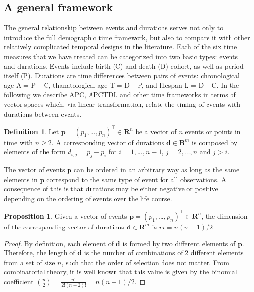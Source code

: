 \documentclass{bmcart}
\theoremstyle{definition}
\newtheorem{definition}{Definition}[section]
\newtheorem{proposition}{Proposition}[section]
\begin{document}
\subsection{A general framework}
\label{sec:framework}

The general relationship between events and durations serves not only to
introduce the full demographic time framework, but also to compare it with
other relatively complicated temporal designs in the literature. Each of the six
time measures that we have treated can be categorized into two basic types:
events and durations. Events include birth (C) and death (D) cohort, as well as period
itself (P). Durations are time differences between pairs of events: chronological age A = P -- C, 
thanatological age T = D -- P, and lifespan L = D -- C. In the following we
describe APC, APCTDL and other time frameworks in terms of vector spaces which, via linear transformation, relate the timing of events with durations between events.

\begin{definition} 
  Let $\boldsymbol{p}=(p_1,\ldots,p_n)^\top\in\mathbf{R}^n$ be a vector of $n$
  events or points in time with $n\geq2$. A corresponding vector of durations $\boldsymbol{d}\in\mathbf{R}^m$ is composed by elements of the form $d_{i,j}=p_j-p_i$ for $i=1,\dots,n-1$, $j=2,\dots,n$ and $j>i$.
  \label{def:1}
\end{definition}

The vector of events $\boldsymbol{p}$ can be ordered in an arbitrary way as long as the same elements in $\boldsymbol{p}$ correspond to the same type of event for all observations. A consequence of this is that durations may be either
negative or positive depending on the ordering of events over the life course.

\begin{proposition}
  Given a vector of events $\boldsymbol{p}=(p_1,\ldots,p_n)^\top\in\mathbf{R}^n$, the dimension of the corresponding vector of durations $\boldsymbol{d}\in\mathbf{R}^m$ is $m=n(n-1)/2$.
\end{proposition}

\begin{proof}
  By definition, each element of $\boldsymbol{d}$ is formed by two different elements of $\boldsymbol{p}$. Therefore, the length of $\boldsymbol{d}$ is the number of combinations of 2 different elements from a set of size $n$, such that the order of selection does not matter. From combinatorial theory, it is well known that this value is given by the binomial coefficient $\binom{n}{2}=\frac{n!}{2!(n-2)!}=n(n-1)/2$.
\end{proof}
\end{document}
